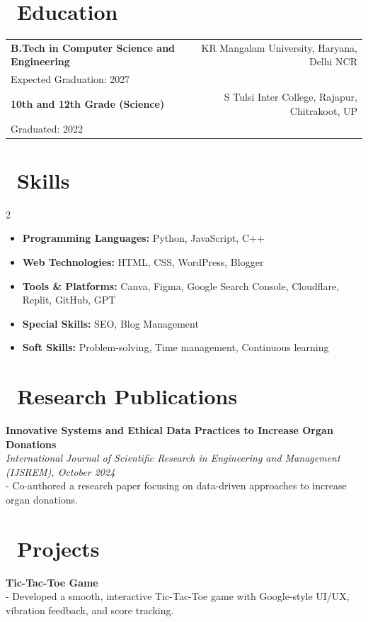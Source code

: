 \documentclass[a4paper,10pt]{article}
\begin{document}
\section*{\faGraduationCap\ Education}
\begin{tabularx}{\textwidth}{Xr}
    \textbf{B.Tech in Computer Science and Engineering} & KR Mangalam University, Haryana, Delhi NCR \\
    Expected Graduation: 2027 & \\
    \textbf{10th and 12th Grade (Science)} & S Tulsi Inter College, Rajapur, Chitrakoot, UP \\
    Graduated: 2022 & \\
\end{tabularx}

\section*{\faCogs\ Skills}
\begin{multicols}{2}
    \begin{itemize}[label=\faCheck]
        \item \textbf{Programming Languages:} Python, JavaScript, C++
        \item \textbf{Web Technologies:} HTML, CSS, WordPress, Blogger
        \item \textbf{Tools \& Platforms:} Canva, Figma, Google Search Console, Cloudflare, Replit, GitHub, GPT
        \item \textbf{Special Skills:} SEO, Blog Management
        \item \textbf{Soft Skills:} Problem-solving, Time management, Continuous learning
    \end{itemize}
\end{multicols}

\section*{\faBook\ Research Publications}
\textbf{Innovative Systems and Ethical Data Practices to Increase Organ Donations} \\
\textit{International Journal of Scientific Research in Engineering and Management (IJSREM), October 2024} \\
- Co-authored a research paper focusing on data-driven approaches to increase organ donations.

\section*{\faProjectDiagram\ Projects}
\textbf{Tic-Tac-Toe Game} \\
- Developed a smooth, interactive Tic-Tac-Toe game with Google-style UI/UX, vibration feedback, and score tracking.
\end{document}
